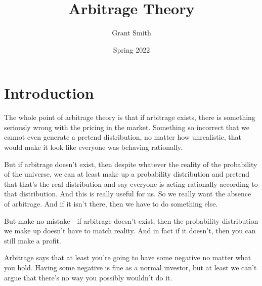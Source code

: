 \documentclass{article}
\title{Arbitrage Theory}
\author{Grant Smith}
\date{Spring 2022}
\begin{document}
\maketitle

\section{Introduction}

The whole point of arbitrage theory is that if arbitrage exists, there is something seriously wrong with the pricing in the market. Something so incorrect that we cannot even generate a pretend distribution, no matter how unrealistic, that would make it look like everyone was behaving rationally. 

But if arbitrage doesn't exist, then despite whatever the reality of the probability of the universe, we can at least make up a probability distribution and pretend that that's the real distribution and say everyone is acting rationally according to that distribution. And this is really useful for us.  So we really want the absence of arbitrage. And if it isn't there, then we have to do something else. 

But make no mistake - if arbitrage doesn't exist, then the probability distribution we make up doesn't have to match reality. And in fact if it doesn't, then you can still make a profit. 

Arbitrage says that at least you're going to have some negative no matter what you hold. Having some negative is fine as a normal investor, but at least we can't argue that there's no way you possibly wouldn't do it.
\end{document}
